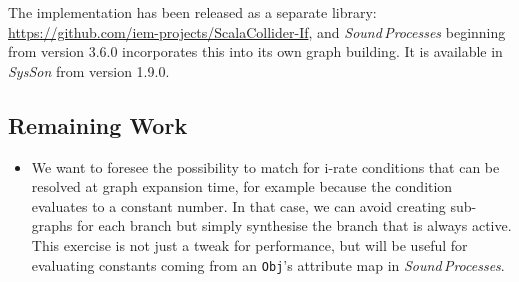\documentclass[11pt,a4paper]{article}
\newcommand{\software}[1]{\textit{#1}}
\begin{document}
The implementation has been released as a separate library: \url{https://github.com/iem-projects/ScalaCollider-If}, and \software{Sound\,Processes} beginning from version 3.6.0 incorporates this into its own graph building. It is available in \software{SysSon} from version 1.9.0.

\subsection{Remaining Work}

\begin{itemize}
\item We want to foresee the possibility to match for i-rate conditions that can be resolved at graph expansion time, for example because the condition evaluates to a constant number. In that case, we can avoid creating sub-graphs for each branch but simply synthesise the branch that is always active. This exercise is not just a tweak for performance, but will be useful for evaluating constants coming from an \Verb!Obj!'s attribute map in \software{Sound\,Processes}.
\end{itemize}

\end{document}
